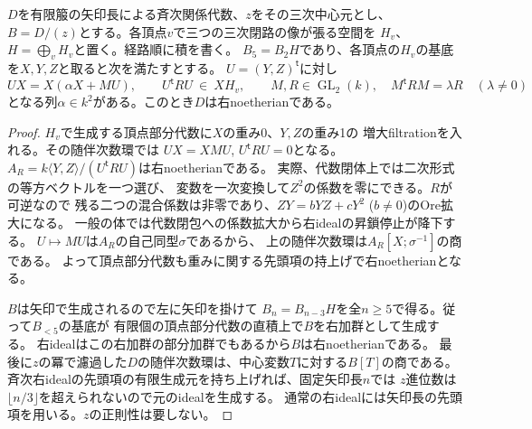 \begin{lemma}[中心商の頂点代数による右noetherian性]
\label{lem:ou-central-corner-criterion}
$D$を有限箙の矢印長による斉次関係代数、$z$をその三次中心元とし、
$B=D/(z)$とする。各頂点$v$で三つの三次閉路の像が張る空間を
$H_v$、$H=\bigoplus_v H_v$と置く。経路順に積を書く。
$B_5=B_2 H$であり、各頂点の$H_v$の基底を$X,Y,Z$と取ると次を満たすとする。
$U=(Y,Z)^{\mathsf t}$に対し
\[
 U X=X(\alpha X+M U),\qquad
 U^{\mathsf t} R U\ \in\ X H_v,\qquad
 M,R\in\operatorname{GL}_2(k),\quad M^{\mathsf t}RM=\lambda R
 \quad(\lambda\ne0)
\]
となる列$\alpha\in k^2$がある。このとき$D$は右noetherianである。
\end{lemma}
\begin{proof}
$H_v$で生成する頂点部分代数に$X$の重み0、$Y,Z$の重み1の
増大filtrationを入れる。その随伴次数環では
$UX=XMU$, $U^{\mathsf t}RU=0$となる。
$A_R=k\langle Y,Z\rangle/(U^{\mathsf t}RU)$は右noetherianである。
実際、代数閉体上では二次形式の等方ベクトルを一つ選び、
変数を一次変換して$Z^2$の係数を零にできる。$R$が可逆なので
残る二つの混合係数は非零であり、$ZY=bYZ+cY^2$ ($b\ne0$)のOre拡大になる。
一般の体では代数閉包への係数拡大から右idealの昇鎖停止が降下する。
$U\mapsto MU$は$A_R$の自己同型$\sigma$であるから、
上の随伴次数環は$A_R[X;\sigma^{-1}]$の商である。
よって頂点部分代数も重みに関する先頭項の持上げで右noetherianとなる。

$B$は矢印で生成されるので左に矢印を掛けて
$B_n=B_{n-3}H$を全$n\ge5$で得る。従って$B_{<5}$の基底が
有限個の頂点部分代数の直積上で$B$を右加群として生成する。
右idealはこの右加群の部分加群でもあるから$B$は右noetherianである。
最後に$z$の冪で濾過した$D$の随伴次数環は、中心変数$T$に対する$B[T]$の商である。
斉次右idealの先頭項の有限生成元を持ち上げれば、固定矢印長$n$では
$z$進位数は$\lfloor n/3\rfloor$を超えられないので元のidealを生成する。
通常の右idealには矢印長の先頭項を用いる。$z$の正則性は要しない。
\end{proof}

